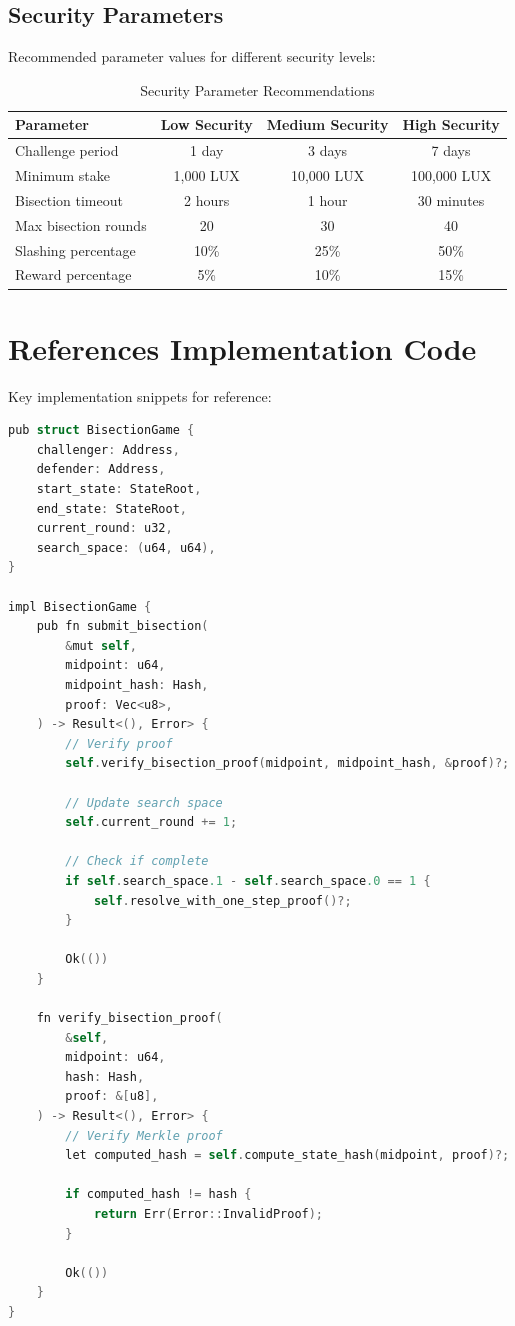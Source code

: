 \documentclass[11pt,a4paper]{article}
\theoremstyle{definition}
\begin{document}
\subsection{Security Parameters}

Recommended parameter values for different security levels:

\begin{table}[h]
\centering
\caption{Security Parameter Recommendations}
\begin{tabular}{lccc}
\toprule
\textbf{Parameter} & \textbf{Low Security} & \textbf{Medium Security} & \textbf{High Security} \\
\midrule
Challenge period & 1 day & 3 days & 7 days \\
Minimum stake & 1,000 LUX & 10,000 LUX & 100,000 LUX \\
Bisection timeout & 2 hours & 1 hour & 30 minutes \\
Max bisection rounds & 20 & 30 & 40 \\
Slashing percentage & 10\% & 25\% & 50\% \\
Reward percentage & 5\% & 10\% & 15\% \\
\bottomrule
\end{tabular}
\end{table}

\section{References Implementation Code}

Key implementation snippets for reference:

\begin{lstlisting}[language=C, caption=Bisection Game Implementation (Rust)]
pub struct BisectionGame {
    challenger: Address,
    defender: Address,
    start_state: StateRoot,
    end_state: StateRoot,
    current_round: u32,
    search_space: (u64, u64),
}

impl BisectionGame {
    pub fn submit_bisection(
        &mut self,
        midpoint: u64,
        midpoint_hash: Hash,
        proof: Vec<u8>,
    ) -> Result<(), Error> {
        // Verify proof
        self.verify_bisection_proof(midpoint, midpoint_hash, &proof)?;
        
        // Update search space
        self.current_round += 1;
        
        // Check if complete
        if self.search_space.1 - self.search_space.0 == 1 {
            self.resolve_with_one_step_proof()?;
        }
        
        Ok(())
    }
    
    fn verify_bisection_proof(
        &self,
        midpoint: u64,
        hash: Hash,
        proof: &[u8],
    ) -> Result<(), Error> {
        // Verify Merkle proof
        let computed_hash = self.compute_state_hash(midpoint, proof)?;
        
        if computed_hash != hash {
            return Err(Error::InvalidProof);
        }
        
        Ok(())
    }
}
\end{lstlisting}
\end{document}
